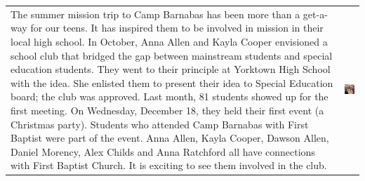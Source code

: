 
\begin{longtable}{ C D } 
The summer mission trip to Camp Barnabas has been more than a get-a-way for our teens. It has inspired them to be involved in mission in their local high school. In October, Anna Allen and Kayla Cooper envisioned a school club that bridged the gap between mainstream students and special education students. They went to their principle at Yorktown High School with the idea. She enlisted them to present their idea to Special Education board; the club was approved. Last month, 81 students showed up for the first meeting. On Wednesday, December 18, they held their first event (a Christmas party). Students who attended Camp Barnabas with First Baptist were part of the event. Anna Allen, Kayla Cooper, Dawson Allen, Daniel Morency, Alex Childs and Anna Ratchford all have connections with First Baptist Church. It is exciting to see them involved in the club.   & \includegraphics[width=2in]{mugs/project_us} \\
[5ex]
\end{longtable}